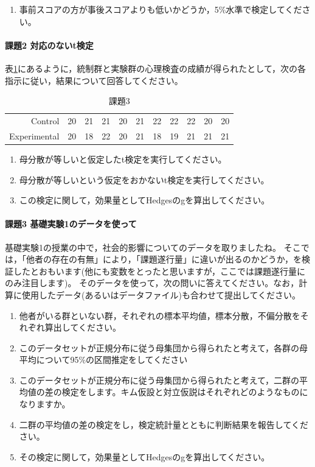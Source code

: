 \documentclass{ltjsbook}
\begin{document}
\begin{enumerate}
    \item 事前スコアの方が事後スコアよりも低いかどうか，5\%水準で検定してください。
\end{enumerate}

\paragraph{課題2 対応のないt検定}
表\ref{exe:20_3}にあるように，統制群と実験群の心理検査の成績が得られたとして，次の各指示に従い，結果について回答してください。
\begin{table}[ht]
\centering
    \caption{課題3}
    \label{exe:20_3}
    \begin{tabular}{rrrrrrrrrrr}
  \hline
    Control & 20 & 21 & 21 & 20 & 21 & 22 & 22 & 22 & 20 & 20 \\ 
  Experimental & 20 & 18 & 22 & 20 & 21 & 18 & 19 & 21 & 21 & 21 \\ 
   \hline
\end{tabular}
\end{table}

\begin{enumerate}
     \item 母分散が等しいと仮定したt検定を実行してください。
     \item 母分散が等しいという仮定をおかないt検定を実行してください。
     \item この検定に関して，効果量としてHedgesのgを算出してください。
\end{enumerate}

\paragraph{課題3 基礎実験1のデータを使って}
基礎実験1の授業の中で，社会的影響についてのデータを取りましたね。
そこでは，「他者の存在の有無」により，「課題遂行量」に違いが出るのかどうか，を検証したとおもいます(他にも変数をとったと思いますが，ここでは課題遂行量にのみ注目します)。
そのデータを使って，次の問いに答えてください。なお，計算に使用したデータ(あるいはデータファイル)も合わせて提出してください。
\begin{enumerate}
    \item 他者がいる群といない群，それぞれの標本平均値，標本分散，不偏分散をそれぞれ算出してください。
    \item このデータセットが正規分布に従う母集団から得られたと考えて，各群の母平均について95\%の区間推定をしてください
    \item このデータセットが正規分布に従う母集団から得られたと考えて，二群の平均値の差の検定をします。キム仮設と対立仮説はそれぞれどのようなものになりますか。
    \item 二群の平均値の差の検定をし，検定統計量とともに判断結果を報告してください。
    \item その検定に関して，効果量としてHedgesのgを算出してください。
\end{enumerate}
\end{document}
